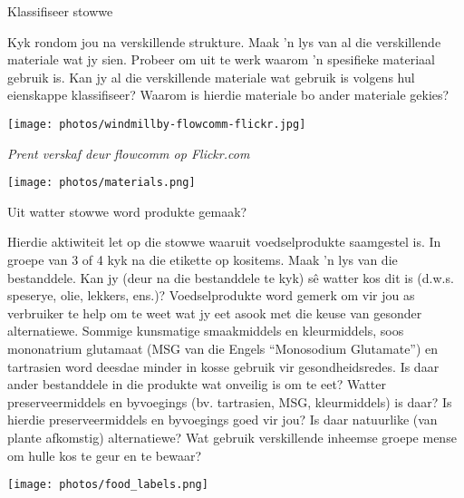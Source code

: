 \begin{activity}{Klassifiseer stowwe} {
\begin{minipage}{.4\textwidth}
Kyk rondom jou na verskillende strukture. Maak 'n lys van al die verskillende materiale wat jy sien. Probeer om uit te werk waarom 'n spesifieke materiaal gebruik is. Kan jy al die verskillende materiale wat gebruik is volgens hul eienskappe klassifiseer? Waarom is hierdie materiale bo ander materiale gekies?
\end{minipage}
\begin{minipage}{.3\textwidth}
\begin{center}
 \texttt{[image: photos/windmillby-flowcomm-flickr.jpg]}\par
\textit{Prent verskaf deur flowcomm op Flickr.com}
\end{center}
\end{minipage}
\begin{minipage}{.3\textwidth}
\begin{center}
 \texttt{[image: photos/materials.png]}\par
\end{center}
\end{minipage}
}
\end{activity}
\clearpage
\begin{activity}{Uit watter stowwe word produkte gemaak?}
{
\begin{minipage}{.5\textwidth}
Hierdie aktiwiteit let op die stowwe waaruit voedselprodukte saamgestel is. In groepe van 3 of 4 kyk na die etikette op kositems. Maak 'n lys van die bestanddele. Kan jy (deur na die bestanddele te kyk) s\^e watter kos dit is (d.w.s. speserye, olie, lekkers, ens.)? Voedselprodukte word gemerk om vir jou as verbruiker te help om te weet wat jy eet asook met die keuse van gesonder alternatiewe. Sommige kunsmatige smaakmiddels en kleurmiddels, soos mononatrium glutamaat (MSG van die Engels ``Monosodium Glutamate'') en tartrasien word deesdae minder in kosse gebruik vir gesondheidsredes. Is daar ander bestanddele in die produkte wat onveilig is om te eet? Watter preserveermiddels en byvoegings (bv. tartrasien, MSG, kleurmiddels) is daar? Is hierdie preserveermiddels en byvoegings goed vir jou? Is daar natuurlike (van plante afkomstig) alternatiewe? Wat gebruik verskillende inheemse groepe mense om hulle kos te geur en te bewaar?
\end{minipage}
\begin{minipage}{.5\textwidth}
 \begin{center}
 \texttt{[image: photos/food\_labels.png]}\par
\end{center}
\end{minipage}

 }  \end{activity}


